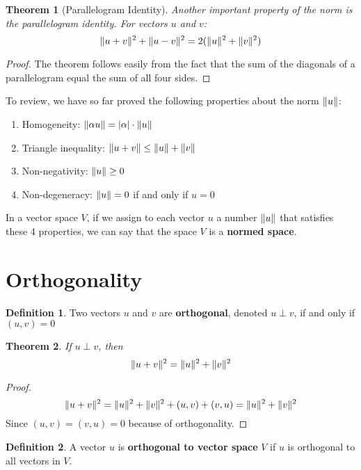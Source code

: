 \documentclass[a4paper,10pt]{book}
\DeclarePairedDelimiter\abs{\lvert}{\rvert}
\DeclarePairedDelimiter{\norm}{\lVert}{\rVert}
\theoremstyle{plain}
\newtheorem{theorem}{Theorem}[section]
\theoremstyle{plain}
\theoremstyle{remark}
\theoremstyle{definition}
\newtheorem{definition}{Definition}[section]
\begin{document}
\begin{theorem}[Parallelogram Identity]
Another important property of the norm is the parallelogram identity. For vectors $u$ and $v$: 
$$\norm{u + v}^{2} + \norm{u - v}^{2} = 2( \norm{u}^{2} + \norm{v}^{2} )$$
\end{theorem}

\begin{proof}
The theorem follows easily from the fact that the sum of the diagonals of a parallelogram equal the sum of all four sides. 
\end{proof}

To review, we have so far proved the following properties about the norm $\norm{u}$: 
\begin{enumerate}
	\item Homogeneity: $\norm{\alpha u} = \abs{\alpha} \cdot \norm{u}$ 
	\item Triangle inequality: $\norm{u + v} \leq \norm{u} + \norm{v}$
	\item Non-negativity: $\norm{u} \geq 0$ 
	\item Non-degeneracy: $\norm{u} = 0$ if and only if $u = 0$
\end{enumerate}

In a vector space $V$, if we assign to each vector $u$ a number $\norm{u}$ that satisfies these 4 properties, we can say that the space $V$ is a \textbf{normed space}. 

\section{Orthogonality} 
\begin{definition}
Two vectors $u$ and $v$ are \textbf{orthogonal}, denoted $u \perp v$, if and only if $(u, v) = 0$
\end{definition}

\begin{theorem}
If $u \perp v$, then 
$$\norm{u + v}^{2} = \norm{u}^{2} + \norm{v}^{2}$$
\end{theorem}

\begin{proof}
$$\norm{u + v}^{2} = \norm{u}^{2} + \norm{v}^{2} + (u, v) + (v, u) = \norm{u}^{2} + \norm{v}^{2}$$
Since $(u,v) = (v, u) = 0$ because of orthogonality. 
\end{proof}

\begin{definition}
A vector $u$ is \textbf{orthogonal to vector space} $V$ if $u$ is orthogonal to all vectors in $V$. 
\end{definition}
\end{document}
